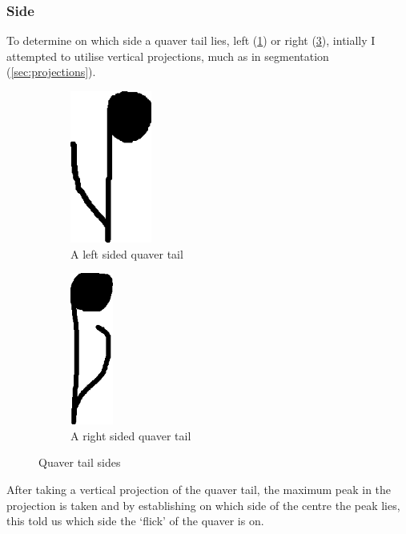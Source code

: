 \subsubsection{Side}\label{sec:scoring-quaver-tail-side}


To determine on which side a quaver tail lies, left (\cref{fig:quaver-tail-left}) or right (\cref{fig:quaver-tail-right}), intially I attempted to utilise vertical projections, much as in segmentation (\cref{sec:projections}).

\begin{figure}[h!]
    \centering

    \begin{subfigure}[b]{.45\linewidth}
        \centering
      \includegraphics[height=5cm]{gfx/techniques/quaver-left-6087.png}
      \caption{A left sided quaver tail}
      \label{fig:quaver-tail-left}
    \end{subfigure}
    \begin{subfigure}[b]{.45\linewidth}
        \centering
      \includegraphics[height=5cm]{gfx/techniques/quaver-right-3083.png}
      \caption{A right sided quaver tail}
      \label{fig:quaver-tail-right}
    \end{subfigure}

    \caption{Quaver tail sides}
\end{figure}

After taking a vertical projection of the quaver tail, the maximum peak in the projection is taken and by establishing on which side of the centre the peak lies, this told us which side the `flick' of the quaver is on.

